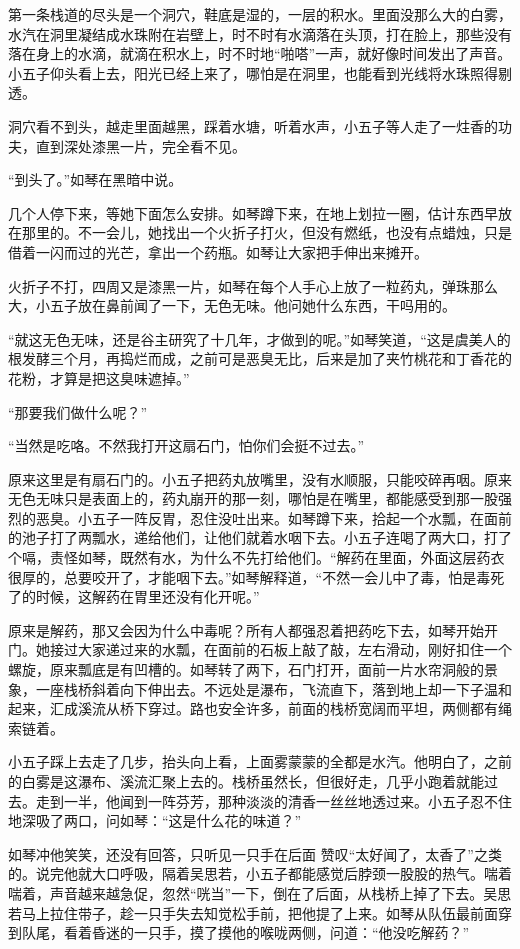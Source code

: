 第一条栈道的尽头是一个洞穴，鞋底是湿的，一层的积水。里面没那么大的白雾，水汽在洞里凝结成水珠附在岩壁上，时不时有水滴落在头顶，打在脸上，那些没有落在身上的水滴，就滴在积水上，时不时地“啪嗒”一声，就好像时间发出了声音。小五子仰头看上去，阳光已经上来了，哪怕是在洞里，也能看到光线将水珠照得剔透。

洞穴看不到头，越走里面越黑，踩着水塘，听着水声，小五子等人走了一炷香的功夫，直到深处漆黑一片，完全看不见。

“到头了。”如琴在黑暗中说。

几个人停下来，等她下面怎么安排。如琴蹲下来，在地上划拉一圈，估计东西早放在那里的。不一会儿，她找出一个火折子打火，但没有燃纸，也没有点蜡烛，只是借着一闪而过的光芒，拿出一个药瓶。如琴让大家把手伸出来摊开。

火折子不打，四周又是漆黑一片，如琴在每个人手心上放了一粒药丸，弹珠那么大，小五子放在鼻前闻了一下，无色无味。他问她什么东西，干吗用的。

“就这无色无味，还是谷主研究了十几年，才做到的呢。”如琴笑道，“这是虞美人的根发酵三个月，再捣烂而成，之前可是恶臭无比，后来是加了夹竹桃花和丁香花的花粉，才算是把这臭味遮掉。”

“那要我们做什么呢？”

“当然是吃咯。不然我打开这扇石门，怕你们会挺不过去。”

原来这里是有扇石门的。小五子把药丸放嘴里，没有水顺服，只能咬碎再咽。原来无色无味只是表面上的，药丸崩开的那一刻，哪怕是在嘴里，都能感受到那一股强烈的恶臭。小五子一阵反胃，忍住没吐出来。如琴蹲下来，拾起一个水瓢，在面前的池子打了两瓢水，递给他们，让他们就着水咽下去。小五子连喝了两大口，打了个嗝，责怪如琴，既然有水，为什么不先打给他们。“解药在里面，外面这层药衣很厚的，总要咬开了，才能咽下去。”如琴解释道，“不然一会儿中了毒，怕是毒死了的时候，这解药在胃里还没有化开呢。”

原来是解药，那又会因为什么中毒呢？所有人都强忍着把药吃下去，如琴开始开门。她接过大家递过来的水瓢，在面前的石板上敲了敲，左右滑动，刚好扣住一个螺旋，原来瓢底是有凹槽的。如琴转了两下，石门打开，面前一片水帘洞般的景象，一座栈桥斜着向下伸出去。不远处是瀑布，飞流直下，落到地上却一下子温和起来，汇成溪流从桥下穿过。路也安全许多，前面的栈桥宽阔而平坦，两侧都有绳索链着。

小五子踩上去走了几步，抬头向上看，上面雾蒙蒙的全都是水汽。他明白了，之前的白雾是这瀑布、溪流汇聚上去的。栈桥虽然长，但很好走，几乎小跑着就能过去。走到一半，他闻到一阵芬芳，那种淡淡的清香一丝丝地透过来。小五子忍不住地深吸了两口，问如琴：“这是什么花的味道？”

如琴冲他笑笑，还没有回答，只听见一只手在后面
赞叹“太好闻了，太香了”之类的。说完他就大口呼吸，隔着吴思若，小五子都能感觉后脖颈一股股的热气。喘着喘着，声音越来越急促，忽然“咣当”一下，倒在了后面，从栈桥上掉了下去。吴思若马上拉住带子，趁一只手失去知觉松手前，把他提了上来。如琴从队伍最前面穿到队尾，看着昏迷的一只手，摸了摸他的喉咙两侧，问道：“他没吃解药？”

